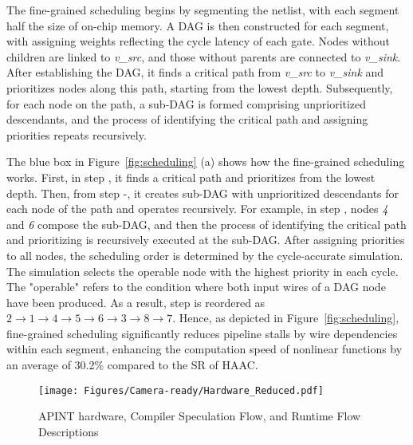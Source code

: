 The fine-grained scheduling begins by segmenting the netlist, with each segment half the size of on-chip memory. A DAG is then constructed for each segment, with assigning weights reflecting the cycle latency of each gate. Nodes without children are linked to \textit{v\_{src}}, and those without parents are connected to \textit{v\_{sink}}. After establishing the DAG, it finds a critical path from \textit{v\_{src}} to \textit{v\_{sink}} and prioritizes nodes along this path, starting from the lowest depth. Subsequently, for each node on the path, a sub-DAG is formed comprising unprioritized descendants, and the process of identifying the critical path and assigning priorities repeats recursively.

The blue box in Figure~\ref{fig:scheduling} (a) shows how the fine-grained scheduling works. First, in step , it finds a critical path and prioritizes from the lowest depth. Then, from step -, it creates sub-DAG with unprioritized descendants for each node of the path and operates recursively. 
For example, in step , nodes \textit{4} and \textit{6} compose the sub-DAG, and then the process of identifying the critical path and prioritizing is recursively executed at the sub-DAG. After assigning priorities to all nodes, the scheduling order is determined by the cycle-accurate simulation. The simulation selects the operable node with the highest priority in each cycle. The "operable" refers to the condition where both input wires of a DAG node have been produced. As a result, step  is reordered as $2\rightarrow1\rightarrow4\rightarrow5\rightarrow6\rightarrow3\rightarrow8\rightarrow7$. 
Hence, as depicted in Figure~\ref{fig:scheduling}, fine-grained scheduling significantly reduces pipeline stalls by wire dependencies within each segment, enhancing the computation speed of nonlinear functions by an average of 30.2\% compared to the SR of HAAC.

\begin{figure*}[t]
    \vspace{-0.2in}
    \centering
    \texttt{[image: Figures/Camera-ready/Hardware\_Reduced.pdf]}
    \caption{APINT hardware, Compiler Speculation Flow, and Runtime Flow Descriptions}
    \vspace{-0.2in}
    \label{fig:compiler_and_hardware}
\end{figure*}
